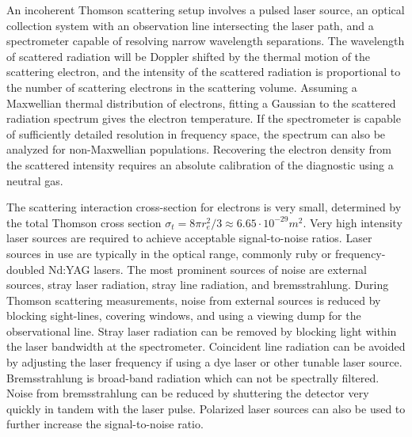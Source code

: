 \documentclass{jpp}
\begin{document}
An incoherent Thomson scattering setup involves a pulsed laser source, an optical collection system with an observation line intersecting the laser path, and a spectrometer capable of resolving narrow wavelength separations. The wavelength of scattered radiation will be Doppler shifted by the thermal motion of the scattering electron, and the intensity of the scattered radiation is proportional to the number of scattering electrons in the scattering volume. Assuming a Maxwellian thermal distribution of electrons, fitting a Gaussian to the scattered radiation spectrum gives the electron temperature. If the spectrometer is capable of sufficiently detailed resolution in frequency space, the spectrum can also be analyzed for non-Maxwellian populations. Recovering the electron density from the scattered intensity requires an absolute calibration of the diagnostic using a neutral gas.

The scattering interaction cross-section for electrons is very small, determined by the total Thomson cross section $\sigma_t = 8 \pi r_e ^2 / 3 \approx 6.65\cdot 10^{-29} m^2$. Very high intensity laser sources are required to achieve acceptable signal-to-noise ratios. Laser sources in use are typically in the optical range, commonly ruby or frequency-doubled Nd:YAG lasers. The most prominent sources of noise are external sources, stray laser radiation, stray line radiation, and bremsstrahlung. During Thomson scattering measurements, noise from external sources is reduced by blocking sight-lines, covering windows, and using a viewing dump for the observational line. Stray laser radiation can be removed by blocking light within the laser bandwidth at the spectrometer. Coincident line radiation can be avoided by adjusting the laser frequency if using a dye laser or other tunable laser source. Bremsstrahlung is broad-band radiation which can not be spectrally filtered. Noise from bremsstrahlung can be reduced by shuttering the detector very quickly in tandem with the laser pulse. Polarized laser sources can also be used to further increase the signal-to-noise ratio.
\end{document}
